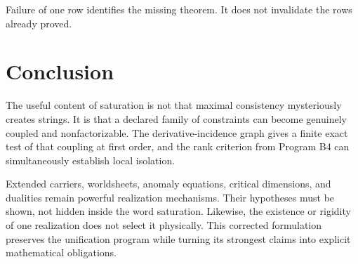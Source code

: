 \documentclass[11pt]{article}
\begin{document}
Failure of one row identifies the missing theorem.  It does not invalidate
the rows already proved.

\section{Conclusion}

The useful content of saturation is not that maximal consistency mysteriously
creates strings.  It is that a declared family of constraints can become
genuinely coupled and nonfactorizable.  The derivative-incidence graph gives a
finite exact test of that coupling at first order, and the rank criterion from
Program B4 can simultaneously establish local isolation.

Extended carriers, worldsheets, anomaly equations, critical dimensions, and
dualities remain powerful realization mechanisms.  Their hypotheses must be
shown, not hidden inside the word saturation.  Likewise, the existence or
rigidity of one realization does not select it physically.  This corrected
formulation preserves the unification program while turning its strongest
claims into explicit mathematical obligations.
\end{document}
